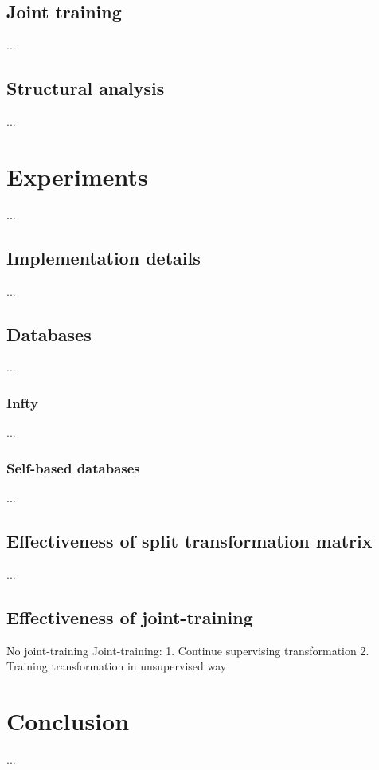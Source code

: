 \documentclass[10pt,conference,a4paper]{IEEEtran}
\begin{document}
	\subsection{Joint training}
	...
	\subsection{Structural analysis}
	...
	\section{Experiments}
	...
	\subsection{Implementation details}
	...
	\subsection{Databases}
	...
	\subsubsection{Infty}
	...
	\subsubsection{Self-based databases}
	...
	\subsection{Effectiveness of split transformation matrix}
	...
	\subsection{Effectiveness of joint-training}
	No joint-training
	Joint-training:
		1. Continue supervising transformation
		2. Training transformation in unsupervised way
	
	
	
	\section{Conclusion}
	...
	
\end{document}
